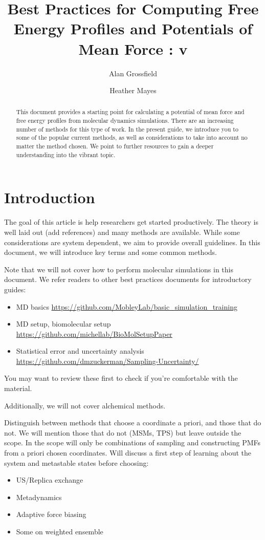 \documentclass[9pt]{livecoms}
\title{Best Practices for Computing Free Energy Profiles and Potentials of Mean Force : v\versionnumber}
\author[1]{Alan Grossfield}
\author[2]{Heather Mayes}
\affil[1]{University of Rochester}
\affil[2]{University of Michigan}
\begin{document}
\begin{frontmatter}
\maketitle

\begin{abstract}
This document provides a starting point for calculating a potential of mean force and free energy profiles from molecular dynamics simulations. There are an increasing number of methods for this type of work. In the present guide, we introduce you to some of the popular current methods, as well as considerations to take into account no matter the method chosen. We point to further resources to gain a deeper understanding into the vibrant topic.
\end{abstract}
\end{frontmatter}

\section{Introduction}

The goal of this article is help researchers get started productively.
The theory is well laid out (add references) and many methods are available.
While some considerations are system dependent, we aim to provide overall guidelines.
In this document, we will introduce key terms and some common methods.

Note that we will not cover how to perform molecular simulations in this document. We refer readers to other best practices documents for introductory guides:
\begin{itemize}
\item MD basics \url{https://github.com/MobleyLab/basic_simulation_training}
\item MD setup, biomolecular setup \url{https://github.com/michellab/BioMolSetupPaper}
\item Statistical error and uncertainty analysis \url{https://github.com/dmzuckerman/Sampling-Uncertainty/}
\end{itemize}
You may want to review these first to check if you're comfortable with the material.

Additionally, we will not cover alchemical methods. 

Distinguish between methods that choose a coordinate a priori, and those that do not. We will mention those that do not (MSMs, TPS) but leave outside the scope.
In the scope will only be combinations of sampling and constructing PMFs from a priori chosen coordinates. Will discuss a first step of learning about the system and metastable states before choosing:
\begin{itemize}
\item US/Replica exchange
\item Metadynamics
\item Adaptive force biasing
\item Some on weighted ensemble
\end{itemize}
\end{document}
